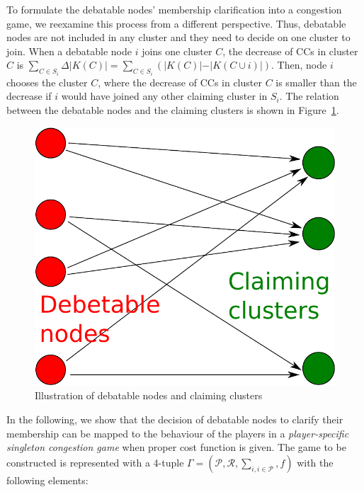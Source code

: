 \documentclass[times]{ettauth}
\theoremstyle{mytheoremstyle}
\theoremstyle{mytheoremstyle}
\theoremstyle{mytheoremstyle}
\begin{document}
To formulate the debatable nodes' membership clarification into a congestion game, we reexamine this process from a different perspective. 
Thus, debatable nodes are not included in any cluster and they need to decide on one cluster to join.
When a debatable node $i$ joins one cluster $C$, the decrease of CCs in cluster $C$ is $\sum_{C\in S_i}\Delta\vert K(C) \vert=\sum_{C\in S_i}({\vert K(C) \vert-\vert K(C\cup i) \vert})$.
Then, node $i$ chooses the cluster $C$, where the decrease of CCs in cluster $C$ is smaller than the decrease if $i$ would have joined any other claiming cluster in $S_i$.
The relation between the debatable nodes and the claiming clusters is shown in Figure~\ref{debatable_nodes_claiming_cluster}.
\begin{figure}[ht!]
  \centering
  \includegraphics[width=0.37\linewidth]{singletongame_matching.pdf}
  \caption{Illustration of debatable nodes and claiming clusters}
  \label{debatable_nodes_claiming_cluster}
\end{figure}
In the following, we show that the decision of debatable nodes to clarify their membership can be mapped to the behaviour of the players in a \textit{player-specific singleton congestion game} when proper cost function is given.
The game to be constructed is represented with a 4-tuple $\Gamma=(\mathcal{P},\mathcal{R},\sum_{i, i \in \mathcal{P}}, f)$ with the following elements:
\end{document}
